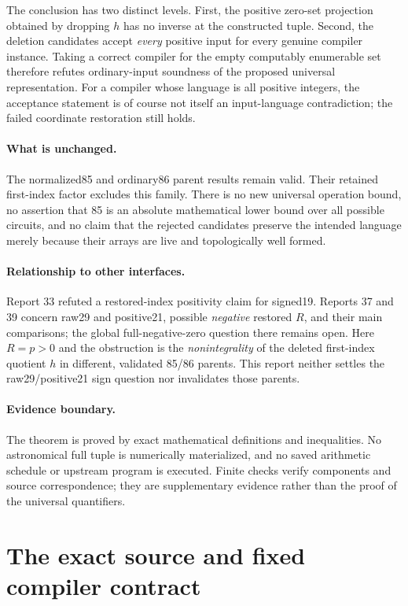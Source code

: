 \documentclass[11pt,letterpaper]{article}
\theoremstyle{definition}\newtheorem{definition}[theorem]{Definition}
\theoremstyle{remark}\newtheorem{remark}[theorem]{Remark}
\begin{document}
The conclusion has two distinct levels. First, the positive zero-set projection obtained by dropping $h$ has no inverse at the constructed tuple. Second, the deletion candidates accept \emph{every} positive input for every genuine compiler instance. Taking a correct compiler for the empty computably enumerable set therefore refutes ordinary-input soundness of the proposed universal representation. For a compiler whose language is all positive integers, the acceptance statement is of course not itself an input-language contradiction; the failed coordinate restoration still holds.

\paragraph{What is unchanged.}
The normalized85 and ordinary86 parent results remain valid. Their retained first-index factor excludes this family. There is no new universal operation bound, no assertion that 85 is an absolute mathematical lower bound over all possible circuits, and no claim that the rejected candidates preserve the intended language merely because their arrays are live and topologically well formed.

\paragraph{Relationship to other interfaces.}
Report 33 refuted a restored-index positivity claim for signed19. Reports 37 and 39 concern raw29 and positive21, possible \emph{negative} restored $R$, and their main comparisons; the global full-negative-zero question there remains open. Here $R=p>0$ and the obstruction is the \emph{nonintegrality} of the deleted first-index quotient $h$ in different, validated 85/86 parents. This report neither settles the raw29/positive21 sign question nor invalidates those parents.

\paragraph{Evidence boundary.}
The theorem is proved by exact mathematical definitions and inequalities. No astronomical full tuple is numerically materialized, and no saved arithmetic schedule or upstream program is executed. Finite checks verify components and source correspondence; they are supplementary evidence rather than the proof of the universal quantifiers.

\section{The exact source and fixed compiler contract}\label{fup:fd:sec:source}
\end{document}
